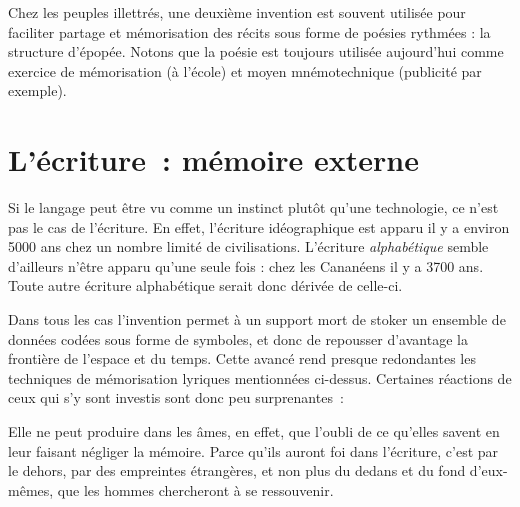 Chez les peuples illettrés, une deuxième invention est souvent utilisée pour faciliter partage et mémorisation des récits sous forme de poésies rythmées : la structure d'épopée\cite{havelock-preface-plato}. Notons que la poésie est toujours utilisée aujourd'hui comme exercice de mémorisation (à l'école) et moyen mnémotechnique (publicité par exemple).

\chapter{L'écriture~: mémoire externe}
Si le langage peut être vu comme un instinct plutôt qu'une technologie, ce n'est pas le cas de l'écriture. En effet, l'écriture idéographique est apparu il y a environ 5000 ans chez un nombre limité de civilisations. L'écriture \emph{alphabétique} semble d'ailleurs n'être apparu qu'une seule fois : chez les Cananéens il y a 3700 ans\cite{linguistics-pinker}. Toute autre écriture alphabétique serait donc dérivée de celle-ci.

Dans tous les cas l'invention permet à un support mort de stoker un ensemble de données codées sous forme de symboles, et donc de repousser d'avantage la frontière de l'espace et du temps. Cette avancé rend presque redondantes les techniques de mémorisation lyriques mentionnées ci-dessus. Certaines réactions de ceux qui s'y sont investis sont donc peu surprenantes~:

\begin{coolquote}
Elle ne peut produire dans les âmes, en effet, que l'oubli de ce qu'elles  savent en leur faisant négliger la mémoire. Parce qu'ils auront foi dans  l'écriture, c'est par le dehors, par des empreintes étrangères, et non plus du dedans et du fond d'eux-mêmes, que les hommes chercheront à se ressouvenir. 
\end{coolquote}

